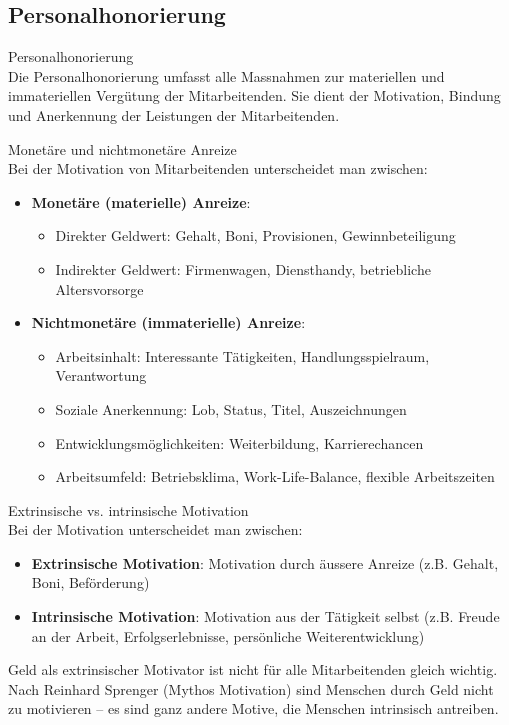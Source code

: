 \subsection{Personalhonorierung}

\begin{definition}{Personalhonorierung}\\
Die Personalhonorierung umfasst alle Massnahmen zur materiellen und immateriellen Vergütung der Mitarbeitenden. Sie dient der Motivation, Bindung und Anerkennung der Leistungen der Mitarbeitenden.
\end{definition}

\begin{definition}{Monetäre und nichtmonetäre Anreize}\\
Bei der Motivation von Mitarbeitenden unterscheidet man zwischen:
\begin{itemize}
    \item \textbf{Monetäre (materielle) Anreize}:
    \begin{itemize}
        \item Direkter Geldwert: Gehalt, Boni, Provisionen, Gewinnbeteiligung
        \item Indirekter Geldwert: Firmenwagen, Diensthandy, betriebliche Altersvorsorge
    \end{itemize}
    \item \textbf{Nichtmonetäre (immaterielle) Anreize}:
    \begin{itemize}
        \item Arbeitsinhalt: Interessante Tätigkeiten, Handlungsspielraum, Verantwortung
        \item Soziale Anerkennung: Lob, Status, Titel, Auszeichnungen
        \item Entwicklungsmöglichkeiten: Weiterbildung, Karrierechancen
        \item Arbeitsumfeld: Betriebsklima, Work-Life-Balance, flexible Arbeitszeiten
    \end{itemize}
\end{itemize}
\end{definition}

\begin{concept}{Extrinsische vs. intrinsische Motivation}\\
Bei der Motivation unterscheidet man zwischen:
\begin{itemize}
    \item \textbf{Extrinsische Motivation}: Motivation durch äussere Anreize (z.B. Gehalt, Boni, Beförderung)
    \item \textbf{Intrinsische Motivation}: Motivation aus der Tätigkeit selbst (z.B. Freude an der Arbeit, Erfolgserlebnisse, persönliche Weiterentwicklung)
\end{itemize}

Geld als extrinsischer Motivator ist nicht für alle Mitarbeitenden gleich wichtig. Nach Reinhard Sprenger (Mythos Motivation) sind Menschen durch Geld nicht zu motivieren – es sind ganz andere Motive, die Menschen intrinsisch antreiben.
\end{concept}


